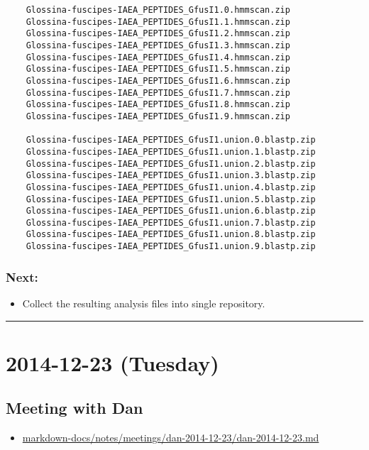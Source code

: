 \documentclass[letterpaper]{scrartcl}
\begin{document}
\begin{verbatim}
    Glossina-fuscipes-IAEA_PEPTIDES_GfusI1.0.hmmscan.zip
    Glossina-fuscipes-IAEA_PEPTIDES_GfusI1.1.hmmscan.zip
    Glossina-fuscipes-IAEA_PEPTIDES_GfusI1.2.hmmscan.zip
    Glossina-fuscipes-IAEA_PEPTIDES_GfusI1.3.hmmscan.zip
    Glossina-fuscipes-IAEA_PEPTIDES_GfusI1.4.hmmscan.zip
    Glossina-fuscipes-IAEA_PEPTIDES_GfusI1.5.hmmscan.zip
    Glossina-fuscipes-IAEA_PEPTIDES_GfusI1.6.hmmscan.zip
    Glossina-fuscipes-IAEA_PEPTIDES_GfusI1.7.hmmscan.zip
    Glossina-fuscipes-IAEA_PEPTIDES_GfusI1.8.hmmscan.zip
    Glossina-fuscipes-IAEA_PEPTIDES_GfusI1.9.hmmscan.zip

    Glossina-fuscipes-IAEA_PEPTIDES_GfusI1.union.0.blastp.zip
    Glossina-fuscipes-IAEA_PEPTIDES_GfusI1.union.1.blastp.zip
    Glossina-fuscipes-IAEA_PEPTIDES_GfusI1.union.2.blastp.zip
    Glossina-fuscipes-IAEA_PEPTIDES_GfusI1.union.3.blastp.zip
    Glossina-fuscipes-IAEA_PEPTIDES_GfusI1.union.4.blastp.zip
    Glossina-fuscipes-IAEA_PEPTIDES_GfusI1.union.5.blastp.zip
    Glossina-fuscipes-IAEA_PEPTIDES_GfusI1.union.6.blastp.zip
    Glossina-fuscipes-IAEA_PEPTIDES_GfusI1.union.7.blastp.zip
    Glossina-fuscipes-IAEA_PEPTIDES_GfusI1.union.8.blastp.zip
    Glossina-fuscipes-IAEA_PEPTIDES_GfusI1.union.9.blastp.zip
\end{verbatim}

\subsubsection{Next:}\label{next}

\begin{itemize}
\itemsep1pt\parskip0pt
\item
  Collect the resulting analysis files into single repository.
\end{itemize}

\begin{center}\rule{0.5\linewidth}{\linethickness}\end{center}

\section{2014-12-23 (Tuesday)}\label{tuesday}

\subsection{Meeting with Dan}\label{meeting-with-dan}

\begin{itemize}
\itemsep1pt\parskip0pt
\item
  \href{file:///home/gus/Dropbox/repos/git/markdown-docs/notes/meetings/dan-2014-12-23/dan-2014-12-23.md}{markdown-docs/notes/meetings/dan-2014-12-23/dan-2014-12-23.md}
\end{itemize}
\end{document}
